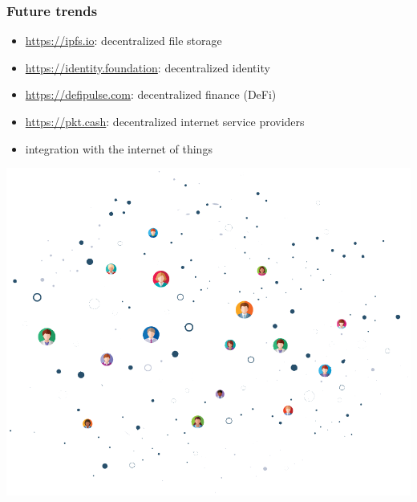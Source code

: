 \documentclass[11pt]{beamer}  %
\begin{document}
\begin{frame}\frametitle{Future trends}

  \begin{itemize}
  \item \alert{\url{https://ipfs.io}}: decentralized file storage
  \item \alert{\url{https://identity.foundation}}: decentralized identity
  \item \alert{\url{https://defipulse.com}}: decentralized finance (DeFi)
  \item \alert{\url{https://pkt.cash}}: decentralized internet service providers
  \item integration with the internet of things
  \end{itemize}

  \begin{center}
    \includegraphics[scale=0.16,clip=false]{pictures/did.png}
  \end{center}

\end{frame}
\end{document}

